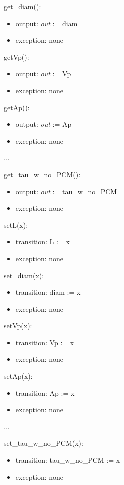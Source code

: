\documentclass[12pt]{article}
\begin{document}
\noindent get\_diam():
\begin{itemize}
\item output: \textit{out} := diam
\item exception: none
\end{itemize}

\noindent getVp():
\begin{itemize}
\item output: \textit{out} := Vp
\item exception: none
\end{itemize}

\noindent getAp():
\begin{itemize}
\item output: \textit{out} := Ap
\item exception: none
\end{itemize}

...

\noindent get\_tau\_w\_no\_PCM():
\begin{itemize}
\item output: \textit{out} := tau\_w\_no\_PCM
\item exception: none
\end{itemize}

\noindent setL(x):
\begin{itemize}
\item transition: L := x
\item exception: none
\end{itemize}

\noindent set\_diam(x):
\begin{itemize}
\item transition: diam := x
\item exception: none
\end{itemize}

\noindent setVp(x):
\begin{itemize}
\item transition: Vp := x
\item exception: none
\end{itemize}

\noindent setAp(x):
\begin{itemize}
\item transition: Ap := x
\item exception: none
\end{itemize}

...

\noindent set\_tau\_w\_no\_PCM(x):
\begin{itemize}
\item transition: tau\_w\_no\_PCM := x
\item exception: none
\end{itemize}
\end{document}
